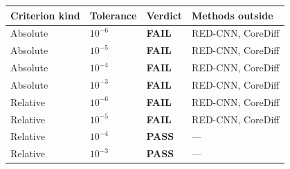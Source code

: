 \begin{tabular}{llll}
\toprule
Criterion kind & Tolerance & Verdict & Methods outside \\
\midrule
Absolute & $10^{-6}$ & \textbf{FAIL} & RED-CNN, CoreDiff \\
Absolute & $10^{-5}$ & \textbf{FAIL} & RED-CNN, CoreDiff \\
Absolute & $10^{-4}$ & \textbf{FAIL} & RED-CNN, CoreDiff \\
Absolute & $10^{-3}$ & \textbf{FAIL} & RED-CNN, CoreDiff \\
\midrule
Relative & $10^{-6}$ & \textbf{FAIL} & RED-CNN, CoreDiff \\
Relative & $10^{-5}$ & \textbf{FAIL} & RED-CNN, CoreDiff \\
Relative & $10^{-4}$ & \textbf{PASS} & --- \\
Relative & $10^{-3}$ & \textbf{PASS} & --- \\
\bottomrule
\end{tabular}
